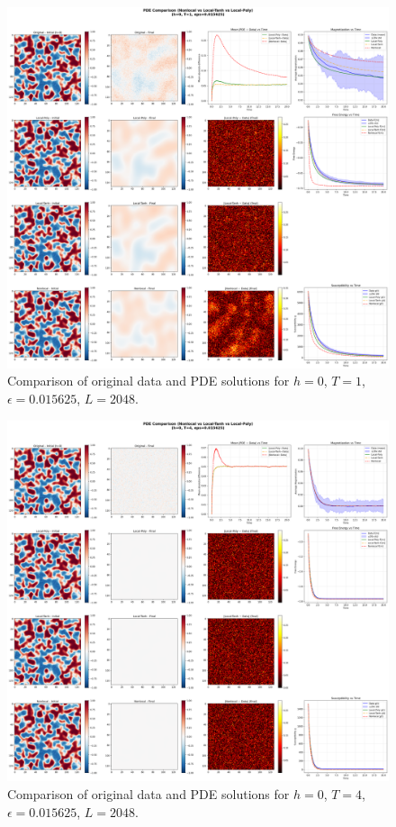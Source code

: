 \documentclass[11pt,a4paper]{article}
\begin{document}

\begin{figure}[!h]
    \centering
    \includegraphics[width=1.0\textwidth]{fig/compare_pde_solvers_L2048_h0_T1_eps0.015625.png}
    \caption{Comparison of original data and PDE solutions for $h=0$, $T=1$, $\epsilon=0.015625$, $L=2048$.}
    \label{fig:pde_comparison_h0_T1_eps0.015625_L2048}
\end{figure}


\begin{figure}[!h]
    \centering
    \includegraphics[width=1.0\textwidth]{fig/compare_pde_solvers_L2048_h0_T4_eps0.015625.png}
    \caption{Comparison of original data and PDE solutions for $h=0$, $T=4$, $\epsilon=0.015625$, $L=2048$.}
    \label{fig:pde_comparison_h0_T4_eps0.015625_L2048}
\end{figure}
\end{document}
